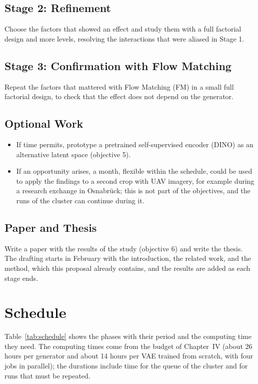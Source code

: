 \subsection{Stage 2: Refinement}

Choose the factors that showed an effect and study them with a full factorial design and more levels, resolving the interactions that were aliased in Stage 1.

\subsection{Stage 3: Confirmation with Flow Matching}

Repeat the factors that mattered with Flow Matching (FM) in a small full factorial design, to check that the effect does not depend on the generator.

\subsection{Optional Work}

\begin{itemize}
  \item If time permits, prototype a pretrained self-supervised encoder (DINO) as an alternative latent space (objective 5).
  \item If an opportunity arises, a month, flexible within the schedule, could be used to apply the findings to a second crop with UAV imagery, for example during a research exchange in Osnabr\"uck; this is not part of the objectives, and the runs of the cluster can continue during it.
\end{itemize}

\subsection{Paper and Thesis}

Write a paper with the results of the study (objective 6) and write the thesis. The drafting starts in February with the introduction, the related work, and the method, which this proposal already contains, and the results are added as each stage ends.

\section{Schedule}

Table~\ref{tab:schedule} shows the phases with their period and the computing time they need. The computing times come from the budget of Chapter~IV (about 26 hours per generator and about 14 hours per VAE trained from scratch, with four jobs in parallel); the durations include time for the queue of the cluster and for runs that must be repeated.

